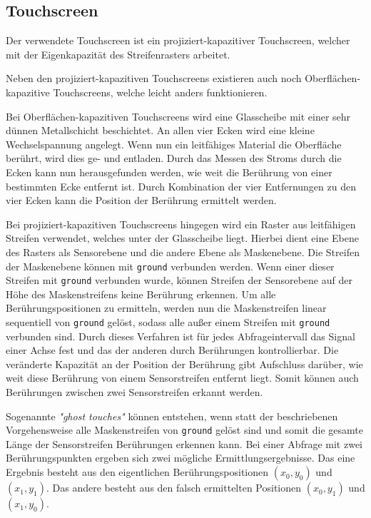\subsection{Touchscreen}

Der verwendete Touchscreen ist ein projiziert-kapazitiver Touchscreen, welcher mit der Eigenkapazität des Streifenrasters arbeitet. \cite[\itshape4.4~Touch~panel]{ts-userManual}

Neben den projiziert-kapazitiven Touchscreens existieren auch noch Oberflächen-kapazi\-tive Touchscreens, welche leicht anders funktionieren.

Bei Oberflächen-kapazitiven Touchscreens wird eine Glasscheibe mit einer sehr dünnen Metallschicht beschichtet.
An allen vier Ecken wird eine kleine Wechselspannung angelegt.
Wenn nun ein leitfähiges Material die Oberfläche berührt, wird dies ge- und entladen.
Durch das Messen des Stroms durch die Ecken kann nun herausgefunden werden, wie weit die Berührung von einer bestimmten Ecke entfernt ist.
Durch Kombination der vier Entfernungen zu den vier Ecken kann die Position der Berührung ermittelt werden.
\cite[\itshape8~Findings~and~Discussion]{ts-holzinger}

Bei projiziert-kapazitiven Touchscreens hingegen wird ein Raster aus leitfähigen Streifen verwendet, welches unter der Glasscheibe liegt.
Hierbei dient eine Ebene des Rasters als Sensorebene und die andere Ebene als Maskenebene.
Die Streifen der Maskenebene können mit \texttt{ground} verbunden werden.
Wenn einer dieser Streifen mit \texttt{ground} verbunden wurde, können Streifen der Sensorebene auf der Höhe des Maskenstreifens keine Berührung erkennen.
Um alle Berührungspositionen zu ermitteln, werden nun die Maskenstreifen linear sequentiell von \texttt{ground} gelöst, sodass alle außer einem Streifen mit \texttt{ground} verbunden sind.
Durch dieses Verfahren ist für jedes Abfrageintervall das Signal einer Achse fest und das der anderen durch Berührungen kontrollierbar.
Die veränderte Kapazität an der Position der Berührung gibt Aufschluss darüber, wie weit diese Berührung von einem Sensorstreifen entfernt liegt.
Somit können auch Berührungen zwischen zwei Sensorstreifen erkannt werden.
\cite{ts-self_capacitive_multitouch}

Sogenannte \textit{"ghost touches"} können entstehen, wenn statt der beschriebenen Vorgehensweise alle Maskenstreifen von \texttt{ground} gelöst sind und somit die gesamte Länge der Sensorstreifen Berührungen erkennen kann.
Bei einer Abfrage mit zwei Berührungspunkten ergeben sich zwei mögliche Ermittlungsergebnisse.
Das eine Ergebnis besteht aus den eigentlichen Berührungspositionen $(x_0,y_0)$ und $(x_1,y_1)$.
Das andere besteht aus den falsch ermittelten Positionen $(x_0,y_1)$ und $(x_1,y_0)$.

